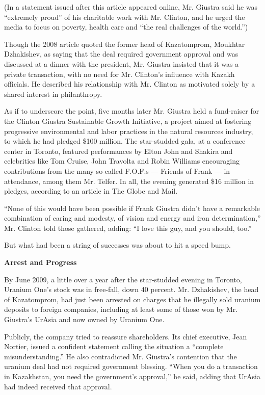 (In a statement issued after this article appeared online, Mr. Giustra
said he was ``extremely proud'' of his charitable work with Mr. Clinton,
and he urged the media to focus on poverty, health care and ``the real
challenges of the world.'')

Though the 2008 article quoted the former head of Kazatomprom, Moukhtar
Dzhakishev, as saying that the deal required government approval and was
discussed at a dinner with the president, Mr. Giustra insisted that it
was a private transaction, with no need for Mr. Clinton's influence with
Kazakh officials. He described his relationship with Mr. Clinton as
motivated solely by a shared interest in philanthropy.

As if to underscore the point, five months later Mr. Giustra held a
fund-raiser for the Clinton Giustra Sustainable Growth Initiative, a
project aimed at fostering progressive environmental and labor practices
in the natural resources industry, to which he had pledged \$100
million. The star-studded gala, at a conference center in Toronto,
featured performances by Elton John and Shakira and celebrities like Tom
Cruise, John Travolta and Robin Williams encouraging contributions from
the many so-called F.O.F.s --- Friends of Frank --- in attendance, among
them Mr. Telfer. In all, the evening generated \$16 million in pledges,
according to an article in The Globe and Mail.

``None of this would have been possible if Frank Giustra didn't have a
remarkable combination of caring and modesty, of vision and energy and
iron determination,'' Mr. Clinton told those gathered, adding: ``I love
this guy, and you should, too.''

But what had been a string of successes was about to hit a speed bump.

\textbf{Arrest and Progress}

By June 2009, a little over a year after the star-studded evening in
Toronto, Uranium One's stock was in free-fall, down 40 percent. Mr.
Dzhakishev, the head of Kazatomprom, had just been arrested on charges
that he illegally sold uranium deposits to foreign companies, including
at least some of those won by Mr. Giustra's UrAsia and now owned by
Uranium One.

Publicly, the company tried to reassure shareholders. Its chief
executive, Jean Nortier, issued a confident statement calling the
situation a ``complete misunderstanding.'' He also contradicted Mr.
Giustra's contention that the uranium deal had not required government
blessing. ``When you do a transaction in Kazakhstan, you need the
government's approval,'' he said, adding that UrAsia had indeed received
that approval.

